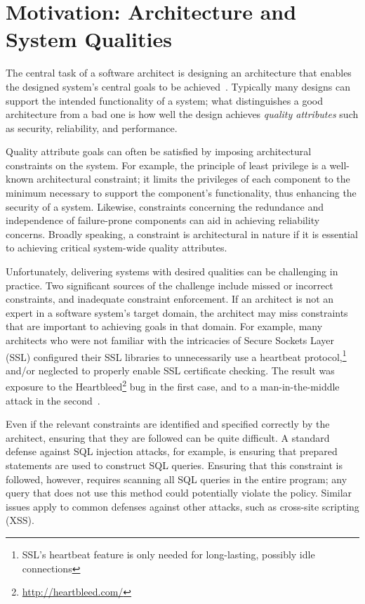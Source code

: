 \documentclass[runningheads]{llncs}
\begin{document}
\begin{sloppypar}
\section{Motivation: Architecture and System Qualities}
The central task of a software architect is designing an architecture that enables the designed system's central goals to be achieved~\cite{BCK03}.  Typically many designs can support the intended functionality of a system; what distinguishes a good architecture from a bad one is how well the design achieves \emph{quality attributes} such as security, reliability, and performance.

Quality attribute goals can often be satisfied by imposing architectural constraints on the system.  For example, the principle of least privilege is a well-known architectural constraint; it limits the privileges of each component to the minimum necessary to support the component's functionality, thus enhancing the security of a system.  Likewise, constraints concerning the redundance and independence of failure-prone components can aid in achieving reliability concerns.  Broadly speaking, a constraint is architectural in nature if it is essential to achieving critical system-wide quality attributes.

Unfortunately, delivering systems with desired qualities can be challenging in practice.  Two significant sources of the challenge include missed or incorrect constraints, and inadequate constraint enforcement.  If an architect is not an expert in a software system's target domain, the architect may miss constraints that are important to achieving goals in that domain.  For example, many architects who were not familiar with the intricacies of Secure Sockets Layer (SSL) configured their SSL libraries to unnecessarily use a heartbeat protocol,\footnote{SSL's heartbeat feature is only needed for long-lasting, possibly idle connections} and/or neglected to properly enable SSL certificate checking.  The result was exposure to the Heartbleed\footnote{\url{http://heartbleed.com/}} bug in the first case, and to a man-in-the-middle attack in the second~\cite{GIJABS12}.

Even if the relevant constraints are identified and specified correctly by the architect, ensuring that they are followed can be quite difficult.  A standard defense against SQL injection attacks, for example, is ensuring that prepared statements are used to construct SQL queries.  Ensuring that this constraint is followed, however, requires scanning all SQL queries in the entire program; any query that does not use this method could potentially violate the policy.  Similar issues apply to common defenses against other attacks, such as cross-site scripting (XSS).


\end{sloppypar}
\end{document}
